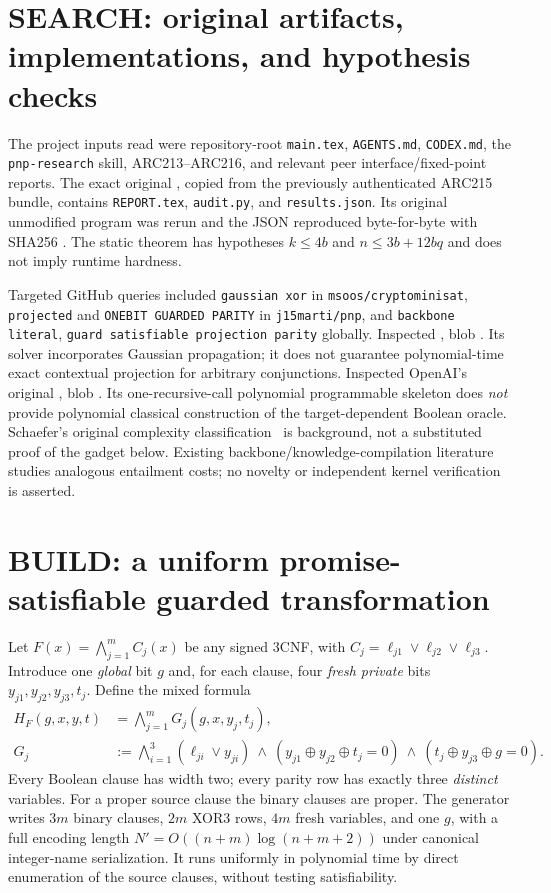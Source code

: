 \documentclass[11pt]{article}
\begin{document}
\section{SEARCH: original artifacts, implementations, and hypothesis checks}
The project inputs read were repository-root \texttt{main.tex}, \texttt{AGENTS.md}, \texttt{CODEX.md}, the \texttt{pnp-research} skill, ARC213--ARC216, and relevant peer interface/fixed-point reports. The exact original , copied from the previously authenticated ARC215 bundle, contains \texttt{REPORT.tex}, \texttt{audit.py}, and \texttt{results.json}. Its original unmodified program was rerun and the JSON reproduced byte-for-byte with SHA256 . The static theorem has hypotheses $k\le4b$ and $n\le3b+12bq$ and does not imply runtime hardness.

Targeted GitHub queries included \texttt{gaussian xor} in \texttt{msoos/cryptominisat}, \texttt{projected} and \texttt{ONEBIT GUARDED PARITY} in \texttt{j15marti/pnp}, and \texttt{backbone literal}, \texttt{guard satisfiable projection parity} globally. Inspected , blob . Its solver incorporates Gaussian propagation; it does not guarantee polynomial-time exact contextual projection for arbitrary conjunctions. Inspected OpenAI's original , blob . Its one-recursive-call polynomial programmable skeleton does \emph{not} provide polynomial classical construction of the target-dependent Boolean oracle. Schaefer's original complexity classification~\cite{schaefer1978} is background, not a substituted proof of the gadget below. Existing backbone/knowledge-compilation literature studies analogous entailment costs; no novelty or independent kernel verification is asserted.

\section{BUILD: a uniform promise-satisfiable guarded transformation}
Let $F(x)=\bigwedge_{j=1}^{m}C_j(x)$ be any signed 3CNF, with $C_j=\ell_{j1}\vee\ell_{j2}\vee\ell_{j3}$. Introduce one \emph{global} bit $g$ and, for each clause, four \emph{fresh private} bits $y_{j1},y_{j2},y_{j3},t_j$. Define the mixed formula
\begin{align}
 H_F(g,x,y,t)&=\bigwedge_{j=1}^{m}G_j(g,x,y_j,t_j),\\
 G_j&:=\bigwedge_{i=1}^{3}(\ell_{ji}\vee y_{ji})\ \wedge\
 (y_{j1}\oplus y_{j2}\oplus t_j=0)\ \wedge\
 (t_j\oplus y_{j3}\oplus g=0). \label{eq:guard}
\end{align}
Every Boolean clause has width two; every parity row has exactly three \emph{distinct} variables. For a proper source clause the binary clauses are proper. The generator writes $3m$ binary clauses, $2m$ XOR3 rows, $4m$ fresh variables, and one $g$, with a full encoding length $N'=O((n+m)\log(n+m+2))$ under canonical integer-name serialization. It runs uniformly in polynomial time by direct enumeration of the source clauses, without testing satisfiability.
\end{document}

